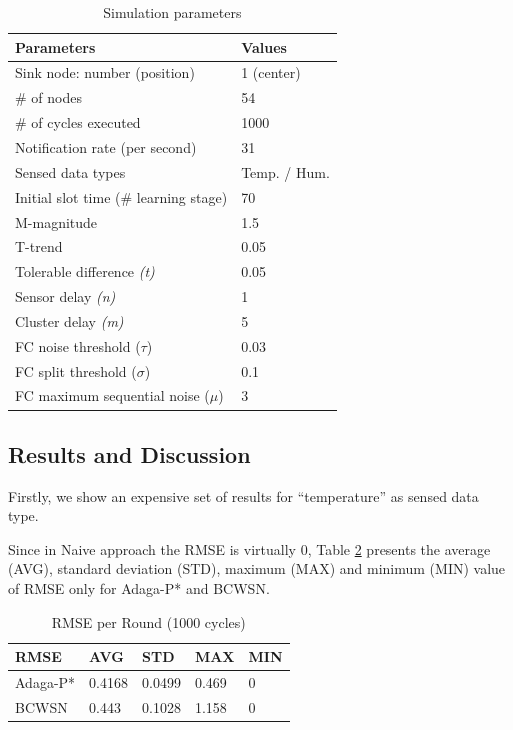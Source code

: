 \documentclass{acm_proc_article-sp}
\begin{document}
\begin{table}[h!]
\caption{Simulation parameters}
\label{tab:parameters}
\begin{center}
\begin{tabular}{|l||l|}
\hline
Parameters &Values\\
\hline\hline
Sink node: number (position) &1 (center) \\
\hline
\# of nodes &54 \\
\hline
\# of cycles executed &1000 \\
\hline
Notification rate (per second) &31 \\
\hline
Sensed data types &Temp. / Hum. \\
\hline
Initial slot time (\# learning stage) &70 \\
\hline
M-magnitude &1.5 \\
\hline
T-trend &0.05 \\
\hline
Tolerable difference {\it(t)} &0.05 \\
\hline
Sensor delay {\it(n)} &1 \\
\hline
Cluster delay {\it(m)} &5 \\
\hline
FC noise threshold ($\tau$) &0.03 \\
\hline
FC split threshold ($\sigma$) &0.1 \\
\hline
FC maximum sequential noise ($\mu$) &3 \\
\hline
\end{tabular}
\end{center}
\end{table}
\vspace*{-.3cm}


\subsection{Results and Discussion}
\label{results-and-discussion}

Firstly, we show an expensive set of results for ``temperature'' as sensed data type. 

Since in Naive approach the RMSE is virtually $0$, Table \ref{tab:rmse} presents 
the average (AVG), standard deviation (STD),
maximum (MAX) and minimum (MIN) value of RMSE only for Adaga-P* and BCWSN.

\begin{table}[h!]
\caption{RMSE per Round (1000 cycles)}
\label{tab:rmse}
\begin{center}
\begin{tabular}{|l||l|l|l|l|}
\hline
RMSE &AVG &STD &MAX &MIN \\
\hline\hline
Adaga-P* &0.4168 &0.0499 &0.469 &0 \\
\hline
BCWSN &0.443 &0.1028 &1.158 &0 \\
\hline
\end{tabular}
\end{center}
\end{table}
\vspace*{-.3cm}
\end{document}
